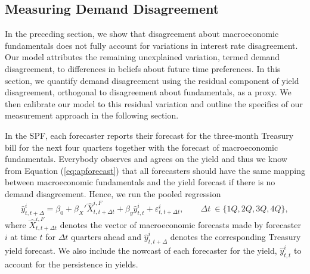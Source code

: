 \documentclass[preprint,11pt,authoryear]{elsarticle}
\theoremstyle{plain}
\begin{document}
\subsection{Measuring Demand Disagreement}\label{sec:measuredemanddis}

In the preceding section, we show that disagreement about macroeconomic fundamentals does not fully account for variations in interest rate disagreement. Our model attributes the remaining unexplained variation, termed demand disagreement, to differences in beliefs about future time preferences. In this section, we quantify demand disagreement using the residual component of yield disagreement, orthogonal to disagreement about fundamentals, as a proxy. We then calibrate our model to this residual variation and outline the specifics of our measurement approach in the following section.  


In the SPF, each forecaster reports their forecast for the three-month Treasury bill for the next four quarters together with the forecast of macroeconomic fundamentals. %
Everybody observes and agrees on the yield and thus we know from Equation (\ref{eq:apforecast}) that all forecasters should have the same mapping between macroeconomic fundamentals and the yield forecast if there is no demand disagreement. Hence, we run the pooled regression
\begin{equation}\label{regEq1}
    \hat{y}^i_{t,t+\Delta} = \beta_0 + \beta_X' \hat{X}^{i,F}_{t,t+\Delta t} + \beta_y \hat{y}^i_{t,t} + \varepsilon^i_{t,t+\Delta t}, \qquad \Delta t\: \in \lbrace{1Q, 2Q,3Q,4Q} \rbrace,
\end{equation}
where $\hat{X}^{i,F}_{t,t+\Delta t}$ denotes the vector of macroeconomic forecasts made by forecaster $i$ at time $t$ for $\Delta t$ quarters ahead and $\hat{y}^i_{t,t+\Delta}$ denotes the corresponding Treasury yield forecast. We also include the nowcast of each forecaster for the yield, $\hat{y}^i_{t,t}$ to account for the persistence in yields. 
\end{document}
